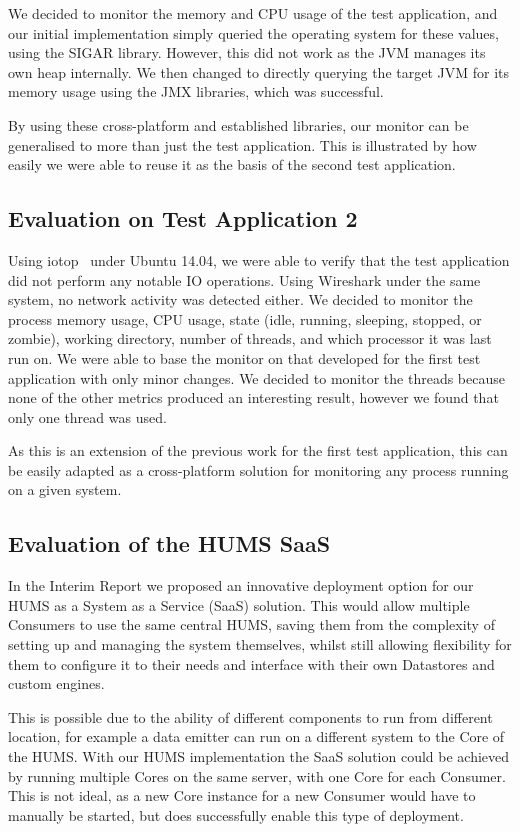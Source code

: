 \documentclass[10pt,a4paper]{article}
\begin{document}
We decided to monitor the memory and CPU usage of the test application, and our initial implementation simply queried the operating system for these values, using the SIGAR library. However, this did not work as the JVM manages its own heap internally. We then changed to directly querying the target JVM for its memory usage using the JMX libraries, which was successful.

By using these cross-platform and established libraries, our monitor can be generalised to more than just the test application. This is illustrated by how easily we were able to reuse it as the basis of the second test application.

\subsection{Evaluation on Test Application 2}
\label{sec:test_app2}

Using iotop~\cite{iotop} under Ubuntu 14.04, we were able to verify that the test application did not perform any notable IO operations. Using Wireshark under the same system, no network activity was detected either.
We decided to monitor the process memory usage, CPU usage, state (idle, running, sleeping, stopped, or zombie), working directory, number of threads, and which processor it was last run on. We were able to base the monitor on that developed for the first test application with only minor changes. We decided to monitor the threads because none of the other metrics produced an interesting result, however we found that only one thread was used.

As this is an extension of the previous work for the first test application, this can be easily adapted as a cross-platform solution for monitoring any process running on a given system. 

\subsection{Evaluation of the HUMS SaaS}
\label{sec:hums_saas}

In the Interim Report we proposed an innovative deployment option for our HUMS as a System as a Service (SaaS) solution. This would allow multiple Consumers to use the same central HUMS, saving them from the complexity of setting up and managing the system themselves, whilst still allowing flexibility for them to configure it to their needs and interface with their own Datastores and custom engines.

This is possible due to the ability of different components to run from different location, for example a data emitter can run on a different system to the Core of the HUMS. With our HUMS implementation the SaaS solution could be achieved by running multiple Cores on the same server, with one Core for each Consumer. This is not ideal, as a new Core instance for a new Consumer would have to manually be started, but does successfully enable this type of deployment.
\end{document}
